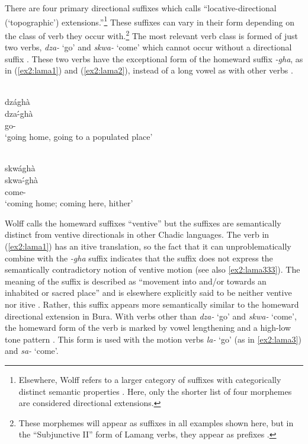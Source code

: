 There are four primary directional suffixes which \citet[140--145]{wolffLamangLanguageDictionary2015} calls ``locative-directional (‘topographic') extensions.''\footnote{Elsewhere, Wolff refers to a larger category of suffixes with categorically distinct semantic properties \citep[150--153, 158, 161]{wolffLamangLanguageDictionary2015}. Here, only the shorter list of four morphemes are considered directional extensions.} These suffixes can vary in their form depending on the class of verb they occur with.\footnote{These morphemes will appear as suffixes in all examples shown here, but in the ``Subjunctive II'' form of Lamang verbs, they appear as prefixes \citep[131, 174]{wolffLamangLanguageDictionary2015}.} The most relevant verb class is formed of just two verbs, \textit{dza-} ‘go’ and \textit{skwa-} ‘come’ which cannot occur without a directional suffix \citep[139]{wolffLamangLanguageDictionary2015}. These two verbs have the exceptional form of the homeward suffix \textit{-gha}, as in (\ref{ex2:lama1}) and (\ref{ex2:lama2}), instead of a long vowel as with other verbs \citep[140]{wolffLamangLanguageDictionary2015}.

\ea\label{ex2:lama1}
 \\
\label{lama1}
\glll dzághà \\
dza-́ghà \\
go-  \\
\glt `going home, going to a populated place'
\z

\ea\label{ex2:lama2}
 \\
\glll skwághà \\
skwa-́ghà \\
come- \\
\glt `coming home; coming here, hither'
\z

Wolff calls the homeward suffixes ``ventive'' but the suffixes are semantically distinct from ventive directionals in other Chadic languages. The verb in (\ref{ex2:lama1}) has an itive translation, so the fact that it can unproblematically combine with the \textit{-gha} suffix indicates that the suffix does not express the semantically contradictory notion of ventive motion (see also \ref{ex2:lama333}). The meaning of the suffix is described as ``movement into and/or towards an inhabited or sacred place'' \citep[140]{wolffLamangLanguageDictionary2015} and is elsewhere explicitly said to be neither ventive nor itive \citep[234]{wolffEncodingTopographyDirection2006}. Rather, this suffix appears more semantically similar to the homeward directional extension in Bura. With verbs other than \textit{dza-} ‘go’ and \textit{skwa-} ‘come’, the homeward form of the verb is marked by vowel lengthening and a high-low tone pattern \citep[151]{wolffLamangLanguageDictionary2015}. This form is used with the  motion verbs \textit{la-} `go' (as in \ref{ex2:lama3}) and \textit{sa-} `come'.

